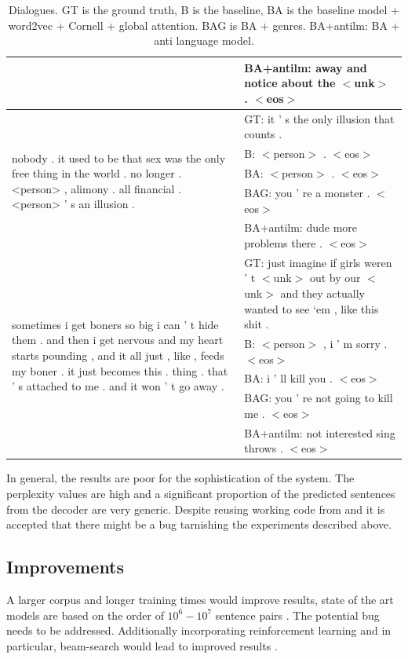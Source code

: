 \documentclass[%
 reprint,
 amsmath,amssymb,
 aps,
]{revtex4-1}
\begin{document}
\begin{table}[t]
\begin{tabular}{| m{8cm} | m{8cm}| }
 & BA+antilm: away and notice about the $<$unk$>$ . $<$eos$>$\\
 \hline
 \multirow{5}{8cm}{nobody . it used to be that sex was the only free thing in the world . no longer . <person> , alimony . all financial . <person> ' s an illusion .} & GT: it ' s the only illusion that counts .\\ 
 & B: $<$person$>$ . $<$eos$>$\\
 & BA: $<$person$>$ . $<$eos$>$\\
 & BAG: you ' re a monster . $<$eos$>$\\
 & BA+antilm: dude more problems there . $<$eos$>$\\
 \hline
 \multirow{5}{8cm}{sometimes i get boners so big i can ' t hide them . and then i get nervous and my heart starts pounding , and it all just , like , feeds my boner . it just becomes this . thing . that ' s attached to me . and it won ' t go away .} & GT: just imagine if girls weren ' t $<$unk$>$ out by our $<$unk$>$ and they actually wanted to see `em , like this shit .\\ 
 & B: $<$person$>$ , i ' m sorry . $<$eos$>$ \\
 & BA: i ' ll kill you . $<$eos$>$ \\
 & BAG: you ' re not going to kill me . $<$eos$>$\\
 & BA+antilm: not interested sing throws . $<$eos$>$ \\
 \hline
\end{tabular}
\caption{Dialogues. GT is the ground truth, B is the baseline, BA is the baseline model + word2vec + Cornell + global attention. BAG is BA + genres. BA+antilm: BA + anti language model.}
\label{table:2}
\end{table}


In general, the results are poor for the sophistication of the system. The perplexity values are high and a significant proportion of the predicted sentences from the decoder are very generic. Despite reusing working code from \cite{githubmatvey} and \cite{antilmgithub} it is accepted that there might be a bug tarnishing the experiments described above.

\subsection{\label{sec:level2}Improvements}

A larger corpus and longer training times would improve results, state of the art models are based on the order of $10^6-10^7$ sentence pairs \cite{localattention} \cite{antilm}. The potential bug needs to be addressed. Additionally incorporating reinforcement learning \cite{rf} and in particular, beam-search would lead to improved results \cite{beamsearch}.
\end{document}
